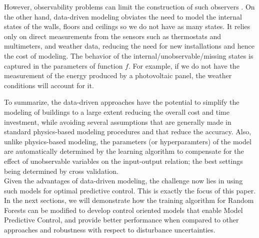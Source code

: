 \begin{enumerate}
{	However, observability problems can limit the construction of such observers \cite{Dorf2011MCS}. 
	On the other hand, data-driven modeling obviates the need to model the internal states of the walls, floors and ceilings so we do not have as many states. 
	It relies only on direct measurements from the sensors such as thermostats and multimeters, and weather data, reducing the need for new installations and hence the cost of modeling.
	The behavior of the internal/unobservable/missing states is captured in the parameters of function \(f\).
	For example, if we do not have the measurement of the energy produced by a photovoltaic panel, the weather conditions will account for it.}
\end{enumerate}

\textcolor[rgb]{0,0,1}{
	To summarize, the data-driven approaches have the potential to simplify the modeling of buildings to a large extent reducing the overall cost and time investment, while avoiding several assumptions that are generally made in standard physics-based modeling procedures and that reduce the accuracy. 
	Also, unlike physics-based modeling, the parameters (or hyperparamters) of the model are automatically determined by the learning algorithm to compensate for the effect of unobservable variables on the input-output relation; the best settings being determined by cross validation.\\
	Given the advantages of data-driven modeling, the challenge now lies in using such models for optimal predictive control.
	This is exactly the focus of this paper. 
	In the next sections, we will demonstrate how the training algorithm for Random Forests can be modified to develop control oriented models that enable Model Predictive Control, and provide better performance when compared to other approaches and robustness with respect to disturbance uncertainties.}